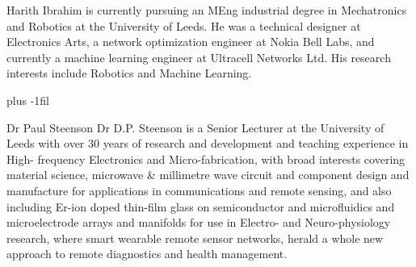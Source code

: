 \documentclass{ieeeaccess}
\begin{document}
\begin{IEEEbiography}{Harith Ibrahim} is currently pursuing an MEng industrial degree in Mechatronics and Robotics at the University of Leeds. He was a technical designer at Electronics Arts, a network optimization engineer at Nokia Bell Labs, and currently a machine learning engineer at Ultracell Networks Ltd. His research interests include Robotics and Machine Learning.
\end{IEEEbiography}

\baselineskip plus -1fil

\begin{IEEEbiography}{Dr Paul Steenson} Dr D.P. Steenson is a Senior Lecturer at the University of Leeds with over 30 years of research and development and teaching experience in High- frequency Electronics and Micro-fabrication, with broad interests covering material science, microwave \& millimetre wave circuit and component design and manufacture for applications in communications and remote sensing, and also including Er-ion doped thin-film glass on semiconductor and microfluidics and microelectrode arrays and manifolds for use in Electro- and Neuro-physiology research, where smart wearable remote sensor networks, herald a whole new approach to remote diagnostics and health management. 
\end{IEEEbiography}

\EOD
\end{document}
